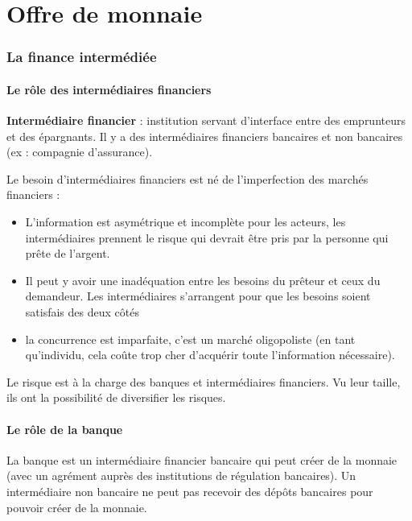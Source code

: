 \part{Offre de monnaie}

\section{La finance intermédiée}

	\subsection{Le rôle des intermédiaires financiers}
	
	\textbf{Intermédiaire financier} : institution servant d'interface entre des emprunteurs et des épargnants. Il y a des intermédiaires financiers bancaires et non bancaires (ex : compagnie d'assurance).
	
	Le besoin d'intermédiaires financiers est né de l'imperfection des marchés financiers :
	
	\begin{itemize}
		\item L'information est asymétrique et incomplète pour les acteurs, les intermédiaires prennent le risque qui devrait être pris par la personne qui prête de l'argent.
	
		\item Il peut y avoir une inadéquation entre les besoins du prêteur et ceux du demandeur. Les intermédiaires s'arrangent pour que les besoins soient satisfais des deux côtés
		
		\item la concurrence est imparfaite, c'est un marché oligopoliste (en tant qu'individu, cela coûte trop cher d'acquérir toute l'information nécessaire).
\end{itemize}
	Le risque est à la charge des banques et intermédiaires financiers. Vu leur taille, ils ont la possibilité de diversifier les risques.
	
	
	\subsection{Le rôle de la banque}
	
	La banque est un intermédiaire financier bancaire qui peut créer de la monnaie (avec un agrément auprès des institutions de régulation bancaires). Un intermédiaire non bancaire ne peut pas recevoir des dépôts bancaires pour pouvoir créer de la monnaie.
	
